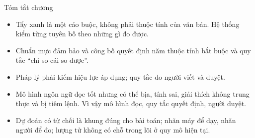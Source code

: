 \FloatBarrier
\begin{hopy}{Tóm tắt chương}
\begin{itemize}
\item Tẩy xanh là một cáo buộc, không phải thuộc tính của văn bản. Hệ thống kiểm từng tuyên bố theo những gì đo được.
\item Chuẩn mực đảm bảo và công bố quyết định năm thuộc tính bắt buộc và quy tắc “chỉ so cái so được”.
\item Pháp lý phải kiểm hiệu lực áp dụng; quy tắc do người viết và duyệt.
\item Mô hình ngôn ngữ đọc tốt nhưng có thể bịa, tính sai, giải thích không trung thực và bị tiêm lệnh. Vì vậy mô hình đọc, quy tắc quyết định, người duyệt.
\item Dự đoán có từ chối là khung đúng cho bài toán; nhãn máy để dạy, nhãn người để đo; lượng tử không có chỗ trong lõi ở quy mô hiện tại.
\end{itemize}
\end{hopy}
